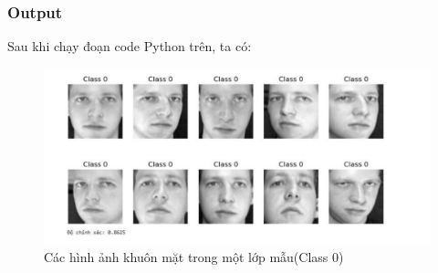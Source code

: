 \documentclass[a4paper,12pt]{extarticle}
\begin{document}
\subsubsection{Output}
Sau khi chạy đoạn code Python trên, ta có:
\begin{figure}[H]
    \centering
    \includegraphics[scale=0.6]{img/10 khuon mat.png}
    \caption{Các hình ảnh khuôn mặt trong một lớp mẫu(Class 0)}
    \label{fig:enter-label}
\end{figure}
\end{document}
